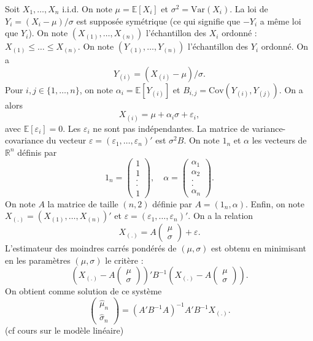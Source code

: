 \documentclass[
]{book}
\theoremstyle{definition}
\theoremstyle{definition}
\theoremstyle{definition}
\theoremstyle{definition}
\theoremstyle{remark}
\begin{document}
Soit \(X_1, \ldots, X_n\) i.i.d. On note \(\mu=\mathbb{E}[X_i]\) et \(\sigma^2=\mbox{Var}(X_i)\). La loi de
\(Y_i=(X_i-\mu)/\sigma\) est supposée symétrique (ce qui signifie que \(-Y_i\) a même loi que \(Y_i\)). On note \((X_{(1)}, \ldots, X_{(n)})\) l'échantillon des \(X_i\) ordonné :
\(X_{(1)} \leq \ldots \leq X_{(n)}\). On note \((Y_{(1)}, \ldots, Y_{(n)})\) l'échantillon des \(Y_i\) ordonné. On a
\[Y_{(i)}=(X_{(i)}-\mu)/\sigma.\]
Pour \(i, j \in \{1, \ldots,n\}\), on note
\(\alpha_i=\mathbb{E}[Y_{(i)}]\) et \(B_{i,j}=\mbox{Cov}(Y_{(i)},Y_{(j)}).\)
On a alors
\[X_{(i)}= \mu+\alpha_i \sigma +\varepsilon_i,\]
avec \(\mathbb{E}[\varepsilon_i]=0\). Les \(\varepsilon_i\) ne sont pas indépendantes. La matrice de variance-covariance du vecteur \(\varepsilon=(\varepsilon_1, \ldots, \varepsilon_n)'\) est \(\sigma^2 B\). On note \(1_n\) et \(\alpha\) les vecteurs de \(\mathbb{R}^n\) définis par
\[1_n=\left( \begin{array}{c}  1\\ 1\\ .\\ .\\ 1\end{array} \right), \quad \alpha=\left(\begin{array}{c}  \alpha_1\\ \alpha_2\\ .\\ .\\ \alpha_n \end{array}\right).\]
On note \(A\) la matrice de taille \((n,2)\) définie par \(A=(1_n, \alpha)\). Enfin, on note
\(X_{(.)}=(X_{(1)}, \ldots, X_{(n)})'\) et \(\varepsilon=(\varepsilon_1, \ldots, \varepsilon_n)'\). On a la relation
\[X_{(.)}= A \left( \begin{array}{c} \mu \\ \sigma \end{array}\right) + \varepsilon.\]
L'estimateur des moindres carrés pondérés de \((\mu, \sigma)\) est obtenu en minimisant en les paramètres \((\mu, \sigma)\) le critère :
\[\left( X_{(.)}- A \left( \begin{array}{c} \mu \\ \sigma \end{array}\right)\right)' B^{-1} \left( X_{(.)}- A \left(\begin{array}{c} \mu \\ \sigma\end{array}\right)\right).\]
On obtient comme solution de ce système
\[\left( \begin{array}{c} \hat{\mu}_n \\ \hat{\sigma}_n \end{array}\right)= (A'B^{-1} A)^{-1} A'B^{-1} X_{(.)}.\]
(cf cours sur le modèle linéaire)
\end{document}
